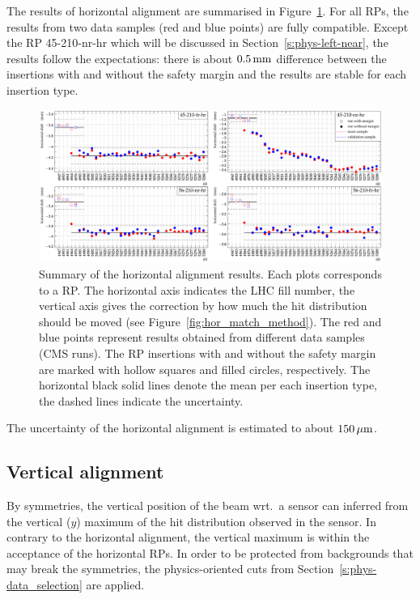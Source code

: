 \documentclass[TOTEM]{cern/cernphprep}
\def\un#1{\,{\rm #1}}
\begin{document}
The results of horizontal alignment are summarised in Figure~\ref{fig:hor_match_results}. For all RPs, the results from two data samples (red and blue points) are fully compatible. Except the RP 45-210-nr-hr which will be discussed in Section~\ref{s:phys-left-near}, the results follow the expectations: there is about $0.5\un{mm}$ difference between the insertions with and without the safety margin and the results are stable for each insertion type.

\begin{figure}[h!]
\begin{center}
\includegraphics[width=\hsize]{fig/physics_fills/final_alignment_x_cmp_ph_sample.pdf}
\caption{%
Summary of the horizontal alignment results. Each plots corresponds to a RP. The horizontal axis indicates the LHC fill number, the vertical axis gives the correction by how much the hit distribution should be moved (see Figure~\ref{fig:hor_match_method}). The red and blue points represent results obtained from different data samples (CMS runs). The RP insertions with and without the safety margin are marked with hollow squares and filled circles, respectively. The horizontal black solid lines denote the mean per each insertion type, the dashed lines indicate the uncertainty.
}
\label{fig:hor_match_results}
\end{center}
\end{figure}

The uncertainty of the horizontal alignment is estimated to about $150\un{\mu m}$.


\subsection{Vertical alignment}
\label{s:phys-vertical}

By symmetries, the vertical position of the beam wrt.~a sensor can inferred from the vertical ($y$) maximum of the hit distribution observed in the sensor. In contrary to the horizontal alignment, the vertical maximum is within the acceptance of the horizontal RPs. In order to be protected from backgrounds that may break the symmetries, the physics-oriented cuts from Section~\ref{s:phys-data_selection} are applied.
\end{document}
